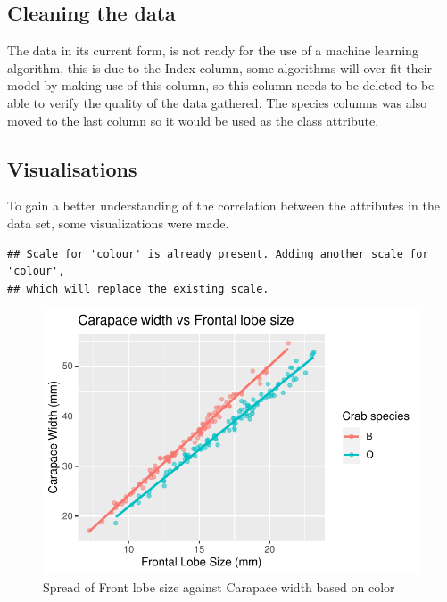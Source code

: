 \documentclass[
]{article}
\begin{document}
\hypertarget{cleaning-the-data}{%
\subsection{Cleaning the data}\label{cleaning-the-data}}

The data in its current form, is not ready for the use of a machine
learning algorithm, this is due to the Index column, some algorithms
will over fit their model by making use of this column, so this column
needs to be deleted to be able to verify the quality of the data
gathered. The species columns was also moved to the last column so it
would be used as the class attribute.

\hypertarget{visualisations}{%
\subsection{Visualisations}\label{visualisations}}

To gain a better understanding of the correlation between the attributes
in the data set, some visualizations were made.

\begin{verbatim}
## Scale for 'colour' is already present. Adding another scale for 'colour',
## which will replace the existing scale.
\end{verbatim}

\begin{figure}[H]

{\centering \includegraphics{CrabProject_files/figure-latex/figure1-1} 

}

\caption{Spread of Front lobe size against Carapace width based on color}\label{fig:figure1}
\end{figure}
\end{document}
